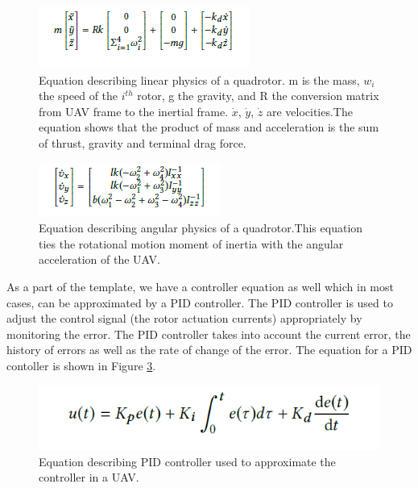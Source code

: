 \begin{figure}
    \centering
    \includegraphics[scale=1.0]{images/linear.png}
    \caption{Equation describing linear physics of a quadrotor. m is the mass, $w_i$ the speed of the $i^{th}$ rotor, g the gravity, and R the conversion matrix from UAV frame to the inertial frame. $\dot{x}$, $\dot{y}$, $\dot{z}$ are velocities.The equation shows that the product of mass and acceleration is the sum of thrust, gravity and terminal drag force.}
    \label{fig:linear}
\end{figure}

\begin{figure}
    \centering
    \includegraphics[scale=1.0]{images/angular.png}
    \caption{Equation describing angular physics of a quadrotor.This equation ties the rotational motion moment of inertia with the angular acceleration of the UAV. }
    \label{fig:angular}
\end{figure}

As a part of the template, we have a controller equation as well which in most cases, can be approximated by a PID controller. The PID controller is used to adjust the control signal (the rotor actuation currents) appropriately by monitoring the error. The PID controller takes into account the current error, the history of errors as well as the rate of change of the error. The equation for a PID contoller is shown in Figure \ref{fig:pid}.

\begin{figure}
    \centering
    \includegraphics[scale=0.5]{images/pid.png}
    \caption{Equation describing PID controller used to approximate the controller in a UAV. }
    \label{fig:pid}
\end{figure}

